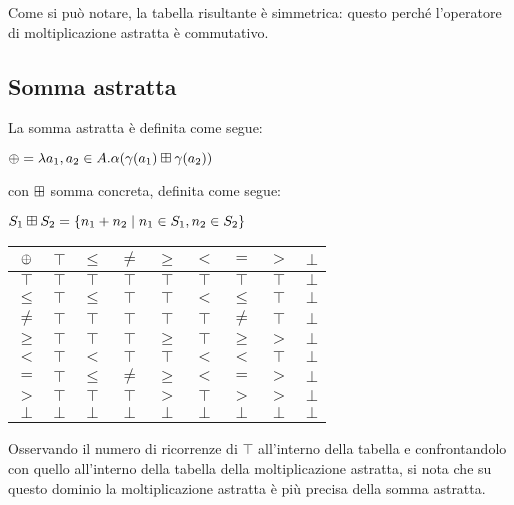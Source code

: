 Come si può notare, la tabella risultante è simmetrica: questo perché l'operatore di moltiplicazione astratta è commutativo.

\subsection{Somma astratta}

La somma astratta è definita come segue:

\begin{center}
	$ \mathbin{\oplus} = \lambda a_1,a_2 \in A . \alpha(\gamma(a_1) \mathbin{\boxplus} \gamma(a_2)) $
\end{center}
con $\mathbin{\boxplus}$ somma concreta, definita come segue:

\begin{center}
	$ S_1 \mathbin{\boxplus} S_2 = \{ n_1 + n_2 \mid n_1 \in S_1, n_2 \in S_2 \} $
\end{center}

\begin{center}
	\begin{tabular}{| c | c | c | c | c | c | c | c | c | }
		\hline
		$\mathbin{\oplus}$ & $\top$ & $\leq$ & $\neq$ & $\geq$ & $<$ & $=$ & $>$ & $\bot$ \\
		\hline
		$\top$ & $\top$ & $\top$ & $\top$ & $\top$ & $\top$ & $\top$ & $\top$ & $\bot$ \\
		\hline
		$\leq$ & $\top$ & $\leq$ & $\top$ & $\top$ & $<$ & $\leq$ & $\top$ & $\bot$\\
		\hline
		$\neq$ & $\top$ & $\top$ & $\top$ & $\top$ & $\top$ & $\neq$ & $\top$ & $\bot$ \\
		\hline
		$\geq$ & $\top$ & $\top$ & $\top$ & $\geq$ & $\top$ & $\geq$ & $>$ & $\bot$\\
		\hline
		$<$ & $\top$ & $<$ & $\top$ & $\top$ & $<$ & $<$ & $\top$ & $\bot$\\
		\hline
		$=$ & $\top$ & $\leq$ & $\neq$ & $\geq$ & $<$ & $=$ & $>$ & $\bot$\\
		\hline
		$>$ & $\top$ & $\top$ & $\top$ & $>$ & $\top$ & $>$ & $>$ & $\bot$ \\
		\hline
		$\bot$ & $\bot$ & $\bot$ & $\bot$ & $\bot$ & $\bot$ & $\bot$ & $\bot$ & $\bot$ \\
		\hline
	\end{tabular}
\end{center}

Osservando il numero di ricorrenze di $\top$ all'interno della tabella e confrontandolo con quello all'interno della tabella della moltiplicazione astratta, si nota che su questo dominio la moltiplicazione astratta è più precisa della somma astratta.

